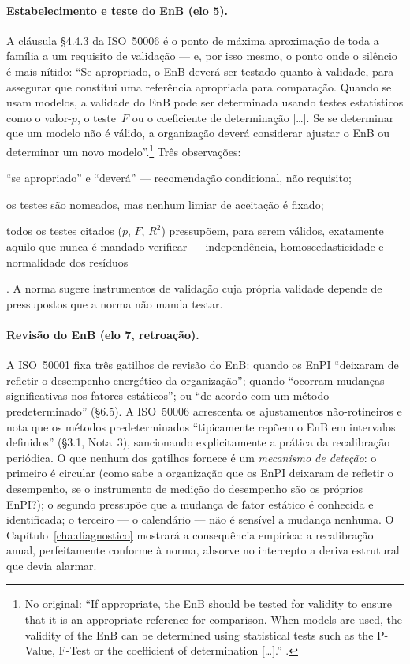 \paragraph{Estabelecimento e teste do EnB (elo 5).} A cláusula \S4.4.3 da ISO~50006 é o ponto de máxima aproximação de toda a família a um requisito de validação --- e, por isso mesmo, o ponto onde o silêncio é mais nítido: \enquote{Se apropriado, o EnB deverá ser testado quanto à validade, para assegurar que constitui uma referência apropriada para comparação. Quando se usam modelos, a validade do EnB pode ser determinada usando testes estatísticos como o valor-$p$, o teste~$F$ ou o coeficiente de determinação [\ldots]. Se se determinar que um modelo não é válido, a organização deverá considerar ajustar o EnB ou determinar um novo modelo}.\footnote{No original: \enquote{If appropriate, the EnB should be tested for validity to ensure that it is an appropriate reference for comparison. When models are used, the validity of the EnB can be determined using statistical tests such as the P-Value, F-Test or the coefficient of determination [\ldots].} \cite[\S4.4.3]{ISO50006_2014}.} Três observações: \begin{enumerate*}[(i)] \item \enquote{se apropriado} e \enquote{deverá} --- recomendação condicional, não requisito; \item os testes são nomeados, mas nenhum limiar de aceitação é fixado; \item todos os testes citados ($p$, $F$, $R^2$) pressupõem, para serem válidos, exatamente aquilo que nunca é mandado verificar --- independência, homoscedasticidade e normalidade dos resíduos\end{enumerate*}. A norma sugere instrumentos de validação cuja própria validade depende de pressupostos que a norma não manda testar.

\paragraph{Revisão do EnB (elo 7, retroação).} A ISO~50001 fixa três gatilhos de revisão do EnB: quando os EnPI \enquote{deixaram de refletir o desempenho energético da organização}; quando \enquote{ocorram mudanças significativas nos fatores estáticos}; ou \enquote{de acordo com um método predeterminado} (\S6.5). A ISO~50006 acrescenta os ajustamentos não-rotineiros e nota que os métodos predeterminados \enquote{tipicamente repõem o EnB em intervalos definidos} (\S3.1, Nota~3), sancionando explicitamente a prática da recalibração periódica. O que nenhum dos gatilhos fornece é um \emph{mecanismo de deteção}: o primeiro é circular (como sabe a organização que os EnPI deixaram de refletir o desempenho, se o instrumento de medição do desempenho são os próprios EnPI?); o segundo pressupõe que a mudança de fator estático é conhecida e identificada; o terceiro --- o calendário --- não é sensível a mudança nenhuma. O Capítulo~\ref{cha:diagnostico} mostrará a consequência empírica: a recalibração anual, perfeitamente conforme à norma, absorve no intercepto a deriva estrutural que devia alarmar.

